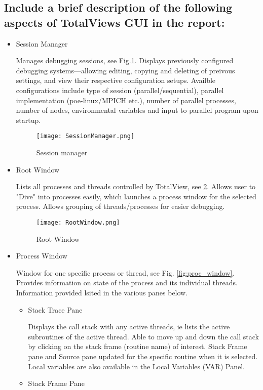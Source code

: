 \documentclass{article}
\begin{document}
\subsection{Include a brief description of the following aspects of TotalViews GUI in the report:}
\begin{itemize}
	\item Session Manager
	
	Manages debugging sessions, see Fig.\ref{fig:sess_manager}. Displays previously configured debugging systems---allowing editing, copying and deleting of preivous settings, and view their respective configuration setups. Availble configurations include type of session (parallel/sequential), parallel implementation (poe-linux/MPICH etc.), number of parallel processes, number of nodes, environmental variables and input to parallel program upon startup.
	\begin{figure}[p] %
		\begin{center}	
		\texttt{[image: SessionManager.png]}
		\caption{Session manager}
		\label{fig:sess_manager}
		\end{center}
	\end{figure}
	\item Root Window
	
	Lists all processes and threads controlled by TotalView, see \ref{fig:root_window}. Allows user to "Dive" into processes easily, which launches a process window for the selected process. Allows grouping of threads/processes for easier debugging.
	\begin{figure}[p] %
	\begin{center}
			\texttt{[image: RootWindow.png]}
		\caption{Root Window}
		\label{fig:root_window}
	\end{center}
	\end{figure}
	\item Process Window
	
	Window for one specific process or thread, see Fig. \ref{fig:proc_window}. Provides information on state of the process and its individual threads. Information provided lsited in the various panes below.
	\begin{itemize}
		\item Stack Trace Pane
		
		Displays the call stack with any active threads, ie lists the active subroutines of the active thread. Able to move up and down the call stack by clicking on the stack frame (routine name) of interest. Stack Frame pane and Source pane updated for the specific routine when it is selected. Local variables are also available in the Local Variables (VAR) Panel.
		\item Stack Frame Pane
		

\end{itemize}
\end{itemize}
\end{document}
